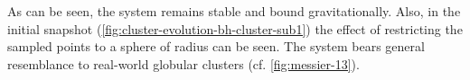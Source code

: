 As can be seen, the system remains stable and bound gravitationally.
Also, in the initial snapshot (\autoref{fig:cluster-evolution-bh-cluster-sub1}) the effect of restricting the sampled points to a sphere of radius can be seen.
The system bears general resemblance to real-world globular clusters (cf. \autoref{fig:messier-13}).



